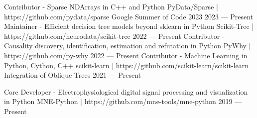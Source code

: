 

\begin{cventries}
  \cventry
    {Contributor - Sparse NDArrays in C++ and Python} %
    {PyData/Sparse | https://github.com/pydata/sparse} %
    {Google Summer of Code 2023} %
    {2023 --- Present} %
    {\empty}
    \vspace{-\baselineskip}
  \cventry
    {Maintainer - Efficient decision tree models beyond sklearn in Python} %
    {Scikit-Tree | https://github.com/neurodata/scikit-tree} %
    {} %
    {2022 --- Present} %
    {\empty}
    \vspace{-\baselineskip}
  \cventry
    {Contributor - Causality discovery, identification, estimation and refutation in Python} %
    {PyWhy | https://github.com/py-why} %
    {} %
    {2022 --- Present} %
    {\empty}
    \vspace{-\baselineskip}
  \cventry
    {Contributor - Machine Learning in Python, Cython, C++} %
    {scikit-learn | https://github.com/scikit-learn/scikit-learn} %
    {Integration of Oblique Trees} %
    {2021 --- Present} %
    {\empty}
    \vspace{-\baselineskip}

  \cventry
    {Core Developer - Electrophysiological digital signal processing and visualization in Python} %
    {MNE-Python | https://github.com/mne-tools/mne-python} %
    {} %
    {2019 --- Present} %
    {\empty}
    \vspace{-\baselineskip}
    

\end{cventries}
